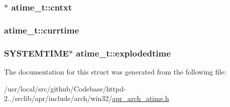 \subsubsection[{\texorpdfstring{cntxt}{cntxt}}]{$\ast$ atime\+\_\+t\+::cntxt}\hypertarget{structatime__t_a044503913be52273e8af26faed71b3b0}{}\label{structatime__t_a044503913be52273e8af26faed71b3b0}
\subsubsection[{\texorpdfstring{currtime}{currtime}}]{ atime\+\_\+t\+::currtime}\hypertarget{structatime__t_a653999daf44e25a51b89ed6d41fdb046}{}\label{structatime__t_a653999daf44e25a51b89ed6d41fdb046}
\subsubsection[{\texorpdfstring{explodedtime}{explodedtime}}]{\setlength{\rightskip}{0pt plus 5cm}S\+Y\+S\+T\+E\+M\+T\+I\+ME$\ast$ atime\+\_\+t\+::explodedtime}\hypertarget{structatime__t_a1bf50d7bf5fd446531357c3b0a33eabf}{}\label{structatime__t_a1bf50d7bf5fd446531357c3b0a33eabf}


The documentation for this struct was generated from the following file\+:\begin{DoxyCompactItemize}
\item 
/usr/local/src/github/\+Codebase/httpd-\/2../srclib/apr/include/arch/win32/\hyperlink{apr__arch__atime_8h}{apr\+\_\+arch\+\_\+atime.\+h}\end{DoxyCompactItemize}
